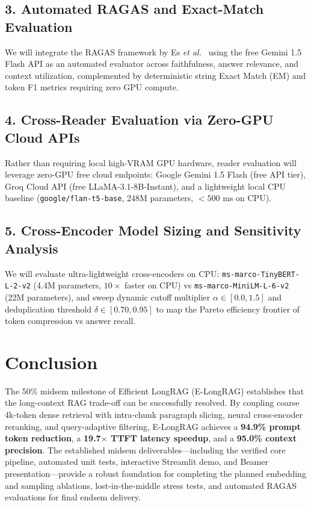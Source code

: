 \documentclass[10pt,journal,compsoc]{IEEEtran}
\begin{document}
\subsection{3. Automated RAGAS and Exact-Match Evaluation}
We will integrate the RAGAS framework by Es \textit{et al.}~\cite{ragas} using the free Gemini 1.5 Flash API as an automated evaluator across faithfulness, answer relevance, and context utilization, complemented by deterministic string Exact Match (EM) and token F1 metrics requiring zero GPU compute.

\subsection{4. Cross-Reader Evaluation via Zero-GPU Cloud APIs}
Rather than requiring local high-VRAM GPU hardware, reader evaluation will leverage zero-GPU free cloud endpoints: Google Gemini 1.5 Flash (free API tier), Groq Cloud API (free LLaMA-3.1-8B-Instant), and a lightweight local CPU baseline (\texttt{google/flan-t5-base}, 248M parameters, $<500\text{ ms}$ on CPU).

\subsection{5. Cross-Encoder Model Sizing and Sensitivity Analysis}
We will evaluate ultra-lightweight cross-encoders on CPU: \texttt{ms-marco-TinyBERT-L-2-v2} (4.4M parameters, $10\times$ faster on CPU) vs \texttt{ms-marco-MiniLM-L-6-v2} (22M parameters), and sweep dynamic cutoff multiplier $\alpha \in [0.0, 1.5]$ and deduplication threshold $\delta \in [0.70, 0.95]$ to map the Pareto efficiency frontier of token compression vs answer recall.

\section{Conclusion}
The 50\% midsem milestone of Efficient LongRAG (E-LongRAG) establishes that the long-context RAG trade-off can be successfully resolved. By coupling coarse 4k-token dense retrieval with intra-chunk paragraph slicing, neural cross-encoder reranking, and query-adaptive filtering, E-LongRAG achieves a \textbf{94.9\% prompt token reduction}, a \textbf{19.7$\times$ TTFT latency speedup}, and a \textbf{95.0\% context precision}. The established midsem deliverables---including the verified core pipeline, automated unit tests, interactive Streamlit demo, and Beamer presentation---provide a robust foundation for completing the planned embedding and sampling ablations, lost-in-the-middle stress tests, and automated RAGAS evaluations for final endsem delivery.
\end{document}
